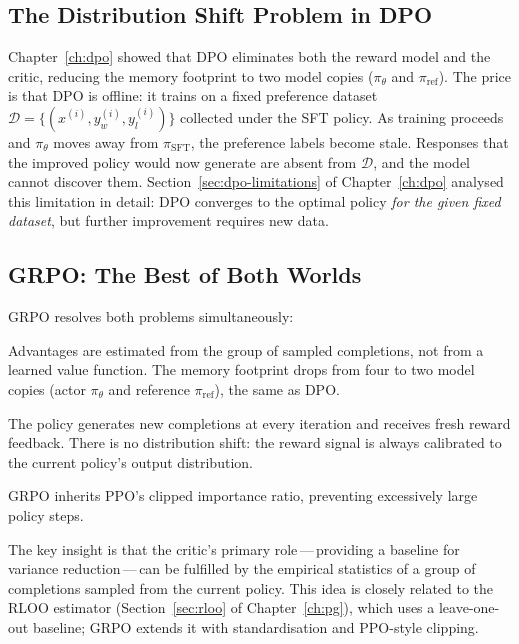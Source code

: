 \subsection{The Distribution Shift Problem in DPO}

Chapter~\ref{ch:dpo} showed that DPO eliminates both the reward model and the critic, reducing the memory footprint to two model copies ($\pi_\theta$ and $\pi_\mathrm{ref}$).  The price is that DPO is offline: it trains on a fixed preference dataset $\mathcal{D} = \{(x^{(i)}, y_w^{(i)}, y_l^{(i)})\}$ collected under the SFT policy.  As training proceeds and $\pi_\theta$ moves away from $\pi_\mathrm{SFT}$, the preference labels become stale.  Responses that the improved policy would now generate are absent from $\mathcal{D}$, and the model cannot discover them.  Section~\ref{sec:dpo-limitations} of Chapter~\ref{ch:dpo} analysed this limitation in detail: DPO converges to the optimal policy \emph{for the given fixed dataset}, but further improvement requires new data.

\subsection{GRPO: The Best of Both Worlds}

GRPO resolves both problems simultaneously:
\begin{description}[leftmargin=!,labelwidth=3.5cm]
  \item[No critic] Advantages are estimated from the group of sampled completions, not from a learned value function.  The memory footprint drops from four to two model copies (actor $\pi_\theta$ and reference $\pi_\mathrm{ref}$), the same as DPO.
  \item[Online] The policy generates new completions at every iteration and receives fresh reward feedback.  There is no distribution shift: the reward signal is always calibrated to the current policy's output distribution.
  \item[Stable updates] GRPO inherits PPO's clipped importance ratio, preventing excessively large policy steps.
\end{description}
The key insight is that the critic's primary role\,---\,providing a baseline for variance reduction\,---\,can be fulfilled by the empirical statistics of a group of completions sampled from the current policy.  This idea is closely related to the RLOO estimator (Section~\ref{sec:rloo} of Chapter~\ref{ch:pg}), which uses a leave-one-out baseline; GRPO extends it with standardisation and PPO-style clipping.

